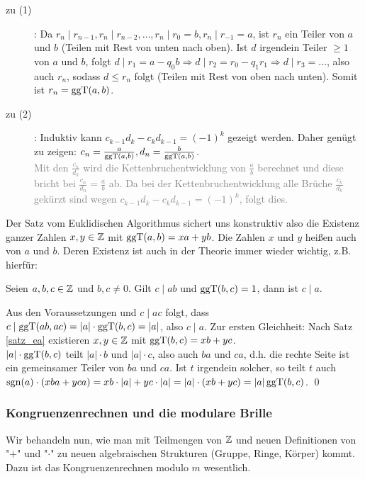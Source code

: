 	\begin{description}
		\item[zu (1)]: Da $r_n \mid r_{n-1}, r_n \mid r_{n-2}, \dots, r_n \mid r_0 = b, r_n \mid r_{-1} = a$, ist $r_n$ ein Teiler von $a$ und $b$ (Teilen mit Rest von unten nach oben). Ist $d$ irgendein Teiler $\geq 1$ von $a$ und $b$, folgt $d \mid r_1 = a -q_0 b \Rightarrow d \mid r_2 = r_0 - q_1 r_1 \Rightarrow d \mid r_3 = \dots$, also auch $r_n$, sodass $d \leq r_n$ folgt (Teilen mit Rest von oben nach unten). Somit ist $r_n = \operatorname{ggT}(a,b)$.
		\item[zu (2)]: Induktiv kann $c_{k-1} d_k - c_k d_{k-1} = (-1)^k$ gezeigt werden. Daher genügt zu zeigen: $c_n = \frac{a}{\operatorname{ggT}(a,b)}, d_n = \frac{b}{\operatorname{ggT}(a,b)}$.  \\
		\textcolor{gray}{Mit den $\frac{c_k}{d_k}$ wird die Kettenbruchentwicklung von $\frac{a}{b}$ berechnet und diese bricht bei $\frac{c_n}{d_n} = \frac{a}{b}$ ab. Da bei der Kettenbruchentwicklung alle Brüche $\frac{c_k}{d_k}$ gekürzt sind wegen $c_{k-1} d_k - c_k d_{k-1} = (-1)^k$, folgt dies.} 
	\end{description}
	
Der Satz vom Euklidischen Algorithmus sichert uns konstruktiv also die Existenz ganzer Zahlen $x,y \in \mathbb{Z}$ mit $\operatorname{ggT}(a,b) = xa + yb$. Die Zahlen $x$ und $y$ heißen auch  von $a$ und $b$. Deren Existenz ist auch in der Theorie immer wieder wichtig, z.B. hierfür:

\begin{lemma}
\label{lemma_21}
	Seien $a,b,c \in \mathbb{Z}$ und $b,c \neq 0$. Gilt $c \mid ab$ und $\operatorname{ggT}(b,c) = 1$, dann ist $c \mid a$.
\end{lemma}

	Aus den Voraussetzungen und $c \mid ac$ folgt, dass $c \mid \operatorname{ggT}(ab,ac) = |a| \cdot \operatorname{ggT}(b,c) = |a|$, also $c \mid a$. Zur ersten Gleichheit: Nach Satz \ref{satz_ea} existieren $x,y \in \mathbb{Z}$ mit $\operatorname{ggT}(b,c) = xb + yc$. \\
	$|a| \cdot \operatorname{ggT}(b,c)$ teilt $|a|\cdot b$ und $|a| \cdot c$, also auch $ba$ und $ca$, d.h. die rechte Seite ist ein gemeinsamer Teiler von $ba$ und $ca$. Ist $t$ irgendein solcher, so teilt $t$ auch $\operatorname{sgn}(a) \cdot(xba + yca) = xb \cdot |a| + yc \cdot |a| = |a| \cdot (xb + yc) = |a| \operatorname{ggT}(b,c)$. \qed

\nextlecture	
\subsubsection{Kongruenzenrechnen und die modulare Brille}
	Wir behandeln nun,\marginnote{[3]} wie man mit Teilmengen von $\mathbb{Z}$ und neuen Definitionen von "$+$" und "$\cdot$" zu neuen algebraischen Strukturen (Gruppe, Ringe, Körper) kommt. Dazu ist das Kongruenzenrechnen modulo $m$ wesentlich.
	
